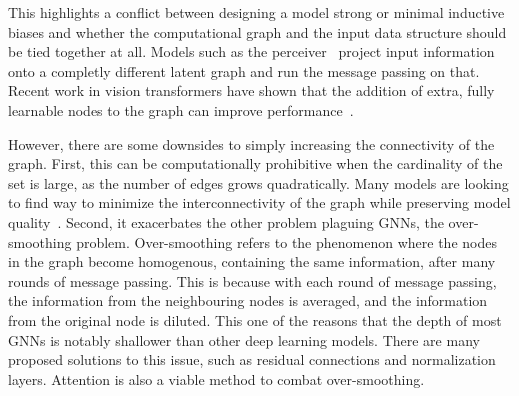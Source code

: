 This highlights a conflict between designing a model strong or minimal inductive biases and whether the computational graph and the input data structure should be tied together at all.
Models such as the perceiver~ project input information onto a completly different latent graph and run the message passing on that.
Recent work in vision transformers have shown that the addition of extra, fully learnable nodes to the graph can improve performance~.

However, there are some downsides to simply increasing the connectivity of the graph.
First, this can be computationally prohibitive when the cardinality of the set is large, as the number of edges grows quadratically.
Many models are looking to find way to minimize the interconnectivity of the graph while preserving model quality~.
Second, it exacerbates the other problem plaguing GNNs, the over-smoothing problem.
Over-smoothing refers to the phenomenon where the nodes in the graph become homogenous, containing the same information, after many rounds of message passing.
This is because with each round of message passing, the information from the neighbouring nodes is averaged, and the information from the original node is diluted.
This one of the reasons that the depth of most GNNs is notably shallower than other deep learning models.
There are many proposed solutions to this issue, such as residual connections and normalization layers.
Attention is also a viable method to combat over-smoothing.

